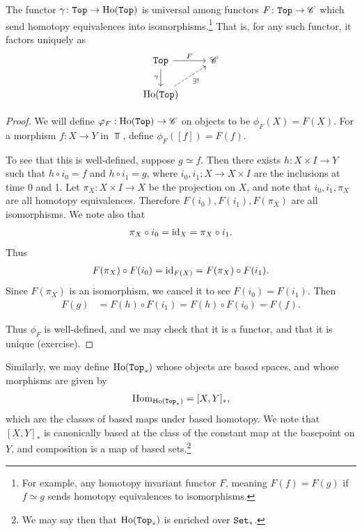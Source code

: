 \documentclass{article}[11pt]
\begin{document}
\begin{proposition} The functor $\gamma \colon \texttt{Top} \to \text{Ho}(\texttt{Top})$ is universal among functors $F\colon \texttt{Top} \to \mathscr{C}$ which send homotopy equivalences into isomorphisms.\footnote{For example, any homotopy invariant functor $F$, meaning $F(f) = F(g)$ if $f\simeq g$ sends homotopy equivalences to isomorphisms. }
That is, for any such functor, it factors uniquely as
\[
	\begin{tikzcd}
	\Top\dar["\gamma" left]\rar["F" above] & \C \\
	\Ho(\Top)\ar[ur,dashed,"\exists!" below right] &
	\end{tikzcd}
\]
\end{proposition}
\begin{proof} We will define $\varphi_F : \text{Ho}(\texttt{Top}) \to \mathscr{C}$ on objects to be $\phi_F(X) = F(X)$. For a morphism  $f\colon  X\to Y$ in $\Top$, define $\phi_F ([f]) = F(f)$.

To see that this is well-defined, suppose $g\simeq f$. Then there exists $h\colon X\times I \to Y$ such that $h \circ i_0 = f$ and $h \circ i_1 = g$, where $i_0,i_1 \colon X \to X\times I$ are the inclusions at time 0 and 1. Let $\pi_X \colon X\times I \to X$ be the projection on $X$, and note that $i_0, i_1, \pi_X$ are all homotopy equivalences. Therefore $F(i_0), F(i_1), F(\pi_X)$ are all isomorphisms. We note also that
\begin{align*}
	\pi_X \circ i_0 = \text{id}_X = \pi_X \circ i_1.
\end{align*}
Thus
\begin{align*}
	F(\pi_X) \circ F(i_0) = \text{id}_{F(X)} = F(\pi_X) \circ F(i_1).
\end{align*}
Since $F(\pi_X)$ is an isomorphism, we cancel it to see $F(i_0) = F(i_1)$. Then
\begin{align*}
	F(g) &= F(h) \circ F(i_1) = F(h)\circ F(i_0) = F(f).
\end{align*}

Thus $\phi_F$ is well-defined, and we may check that it is a functor, and that it is unique (exercise).
\end{proof}

Similarly, we may define $\text{Ho}(\texttt{Top}_\ast)$ whose objects are based spaces, and whose morphisms are given by
\begin{align*}
	\textup{Hom}_{\text{Ho}(\texttt{Top}_\ast)} = [X,Y]_\ast,
\end{align*}
which are the classes of based maps under based homotopy. We note that $[X,Y]_\ast$ is canonically based at the class of the constant map at the basepoint on $Y$, and composition is a map of based sets.\footnote{We may say then that $\text{Ho}(\texttt{Top}_\ast)$ is enriched over $\texttt{Set}_\ast$.}
\end{document}
